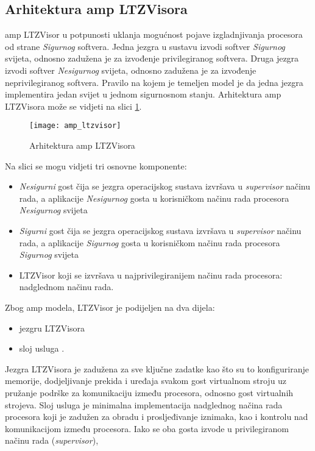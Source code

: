\documentclass[times, utf8, diplomski, numeric]{fer}
\begin{document}
\subsection{Arhitektura \gls{amp} LTZVisora}
\gls{amp} LTZVisor u potpunosti uklanja mogućnost pojave izgladnjivanja procesora od strane \textit{Sigurnog} softvera. Jedna jezgra
u sustavu izvodi softver \textit{Sigurnog} svijeta, odnosno zadužena je za izvođenje privilegiranog softvera. Druga jezgra
izvodi softver \textit{Nesigurnog} svijeta, odnosno zadužena je za izvođenje neprivilegiranog softvera. Pravilo na kojem je
temeljen model je da jedna jezgra implementira jedan svijet u jednom sigurnosnom stanju. Arhitektura \gls{amp} LTZVisora može se
vidjeti na slici \ref{amp_ltzvisor}.
\begin{figure}[H]
  \centering
  \texttt{[image: amp\_ltzvisor]}
  \caption{Arhitektura \gls{amp} LTZVisora \cite{amp_ltzvisor}}
  \label{amp_ltzvisor}
\end{figure}
Na slici se mogu vidjeti tri osnovne komponente:
\begin{itemize}
  \item {\textit{Nesigurni} gost čija se jezgra operacijskog sustava izvršava u \textit{supervisor} načinu rada, a aplikacije
  \textit{Nesigurnog} gosta u korisničkom načinu rada procesora \textit{Nesigurnog} svijeta}
  \item{\textit{Sigurni} gost čija se jezgra operacijskog sustava izvršava u \textit{supervisor} načinu rada, a aplikacije
  \textit{Sigurnog} gosta u korisničkom načinu rada procesora \textit{Sigurnog} svijeta}
  \item{LTZVisor koji se izvršava u najprivilegiranijem načinu rada procesora: nadglednom načinu rada.}
\end{itemize}
\newpage
\noindent
Zbog \gls{amp} modela, LTZVisor je podijeljen na dva dijela:
\begin{itemize}
  \item {jezgru LTZVisora}
  \item{sloj usluga .}
\end{itemize}
Jezgra LTZVisora je zadužena za sve ključne zadatke kao što su to konfiguriranje memorije, dodjeljivanje prekida i uređaja
svakom gost virtualnom stroju uz pružanje podrške za komunikaciju između procesora, odnosno gost virtualnih strojeva.
Sloj usluga je minimalna implementacija nadglednog načina rada procesora koji je zadužen za obradu i prosljeđivanje iznimaka,
kao i kontrolu nad komunikacijom između procesora. Iako se oba gosta izvode u privilegiranom načinu rada (\textit{supervisor}),
\end{document}
